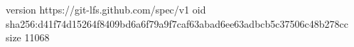 version https://git-lfs.github.com/spec/v1
oid sha256:d41f74d15264f8409bd6a6f79a9f7caf63abad6ee63adbcb5c37506c48b278cc
size 11068
